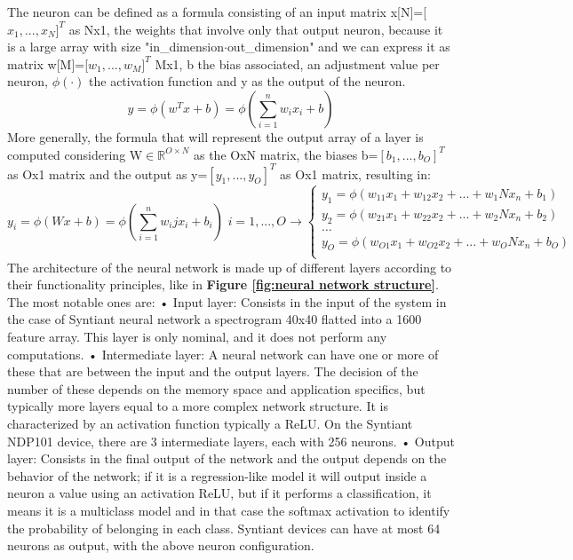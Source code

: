 The neuron can be defined as a formula consisting of an input matrix x[N]=[$x_1,...,x_N$$]^T$ as
Nx1, the weights that involve only that output neuron, because it is a large array with size "in\_dimension$\cdot$out\_dimension" and we can express it as matrix w[M]=[$w_1,...,w_M$$]^T$  Mx1, b the bias associated, an adjustment value per neuron, $\phi(\cdot)$ the activation function and y as the output of the neuron.
\begin{equation}
    y=\phi(w^Tx+b)=\phi(\sum_{i=1}^{n}w_ix_i+b)
\end{equation}
More generally, the formula that will represent the output array of a layer is computed considering W$\in\mathbb{R}^{O\times N}$ as the OxN matrix, the biases b=$[b_1,...,b_O]^T$ as Ox1 matrix and the output as y=$[y_1,...,y_O]^T$ as Ox1 matrix, resulting in:
\begin{equation}
    y_i=\phi(Wx+b)=\phi(\sum_{i=1}^{n}w_ijx_i+b_i)\,\,i=1,...,O\rightarrow \begin{cases}
        y_1=\phi(w_{11}x_1+w_{12}x_2+...+w_1Nx_n+b_1)\\
        y_2=\phi(w_{21}x_1+w_{22}x_2+...+w_2Nx_n+b_2)\\
        \dots\\
        y_O=\phi(w_{O1}x_1+w_{O2}x_2+...+w_ONx_n+b_O)\\
    \end{cases}
\end{equation}
The architecture of the neural network is made up of different layers according to their functionality principles, like in \textbf{Figure \ref{fig:neural network structure}}. The most notable ones are:\newline
• Input layer: Consists in the input of the system in the case of Syntiant neural network a spectrogram 40x40 flatted into a 1600 feature array. This layer is only nominal, and it does not perform any computations.\newline 
• Intermediate layer: A neural network can have one or more of these that are between the input and the output layers. The decision of the number of these depends on the memory space and application specifics, but typically more layers equal to a more complex network structure. It is characterized by an activation function typically a ReLU. On the Syntiant NDP101 device, there are 3 intermediate layers, each with 256 neurons.\newline
• Output layer: Consists in the final output of the network and the output depends on the behavior of the network; if it is a regression-like model it will output inside a neuron a value using an activation ReLU, but if it performs a classification, it means it is a multiclass model and in that case the softmax activation to identify the probability of belonging in each class. Syntiant devices can have at most 64 neurons as output, with the above neuron configuration.

